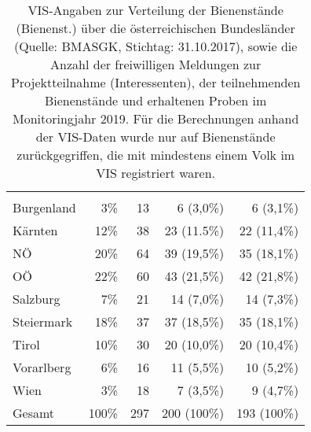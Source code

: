\begin{table}[htp]
    \caption{VIS-Angaben zur Verteilung der Bienenstände (Bienenst.) über die österreichischen Bundesländer (Quelle: BMASGK, Stichtag: 31.10.2017), sowie die Anzahl der freiwilligen Meldungen zur Projektteilnahme (Interessenten), der teilnehmenden Bienenstände und erhaltenen Proben im Monitoringjahr 2019. Für die Berechnungen anhand der VIS-Daten wurde nur auf Bienenstände zurückgegriffen, die mit mindestens einem Volk im VIS registriert waren.}
    \centering
    \begin{tabular}{l|*{4}{r}}
    \toprule
     &
     &
     &
     &
     \\
    &&&& \\
    \midrule
    Burgenland      &   3\%     &   13   & 6 (3,0\%)    & 6 (3,1\%)     \\
    Kärnten         &   12\%    &   38   & 23 (11.5\%)  & 22 (11,4\%)       \\
    NÖ              &   20\%    &   64   & 39 (19,5\%)  & 35 (18,1\%)       \\
    OÖ              &   22\%    &   60   & 43 (21,5\%)  & 42 (21,8\%)       \\
    Salzburg        &   7\%     &   21   & 14 (7,0\%)   & 14 (7,3\%)       \\
    Steiermark      &  18\%     &   37   & 37 (18,5\%)  & 35 (18,1\%)       \\
    Tirol           &   10\%    &   30   & 20 (10,0\%)  & 20 (10,4\%)       \\
    Vorarlberg      &   6\%     &   16   & 11 (5,5\%)   & 10 (5,2\%)       \\
    Wien            &   3\%     &   18   & 7 (3,5\%)    & 9 (4,7\%)       \\
    \midrule
    Gesamt          &   100\%   &   297  & 200 (100\%)  & 193 (100\%)       \\
    \bottomrule
    \end{tabular}
    \label{tab:b:probenanzahl}
\end{table}

